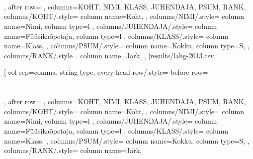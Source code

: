 \documentclass[11pt]{article}
\begin{document}
{\begin{table}[H]
\begin{center}
{{                 \\
                 \\
                 \\
            },
            after row={}
        },
        columns={KOHT, NIMI, KLASS, JUHENDAJA, PSUM, RANK},
        columns/KOHT/.style={
            column name=Koht,
        },
        columns/NIMI/.style={
            column name=Nimi,
            column type={l}
        },
        columns/JUHENDAJA/.style={
            column name=Füüsikaõpetaja,
            column type={l}
        },
        columns/KLASS/.style={
            column name=Klass,
        },
        columns/PSUM/.style={
            column name=Kokku,
            column type={S},
        },
        columns/RANK/.style={
            column name=Järk,
        },
        ]{results/lahg-2013.csv}
    \end{center}
    \end{table}
    \begin{table}[H]
    \begin{center}
    \pgfplotstabletypeset[
        col sep=comma,
        string type,
        every head row/.style={%
            before row={
                 \\
                 \\
                 \\
            },
            after row={}
        },
        columns={KOHT, NIMI, KLASS, JUHENDAJA, PSUM, RANK},
        columns/KOHT/.style={
            column name=Koht,
        },
        columns/NIMI/.style={
            column name=Nimi,
            column type={l}
        },
        columns/JUHENDAJA/.style={
            column name=Füüsikaõpetaja,
            column type={l}
        },
        columns/KLASS/.style={
            column name=Klass,
        },
        columns/PSUM/.style={
            column name=Kokku,
            column type={S},
        },
        columns/RANK/.style={
            column name=Järk,
}
\end{center}
\end{table}}
\end{document}
